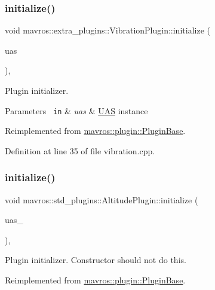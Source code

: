 \subsubsection{\texorpdfstring{initialize()}{initialize()}\hspace{0.1cm}{\footnotesize\ttfamily [8/41]}}
{\footnotesize\ttfamily void mavros\+::extra\+\_\+plugins\+::\+Vibration\+Plugin\+::initialize (\begin{DoxyParamCaption}\item[{\mbox{\hyperlink{classmavros_1_1UAS}{U\+AS}} \&}]{uas }\end{DoxyParamCaption})\hspace{0.3cm}{\ttfamily [inline]}, {\ttfamily [virtual]}}



Plugin initializer. 


\begin{DoxyParams}[1]{Parameters}
\mbox{\texttt{ in}}  & {\em uas} & {\ttfamily \mbox{\hyperlink{classmavros_1_1UAS}{U\+AS}}} instance \\
\hline
\end{DoxyParams}


Reimplemented from \mbox{\hyperlink{group__plugin_gad5313a41da4d26acbbabf008cdc21e82}{mavros\+::plugin\+::\+Plugin\+Base}}.



Definition at line 35 of file vibration.\+cpp.

\mbox{\label{group__plugin_ga5aeb9ab8ababf66ba15c0bf2705c6162}} 
\subsubsection{\texorpdfstring{initialize()}{initialize()}\hspace{0.1cm}{\footnotesize\ttfamily [9/41]}}
{\footnotesize\ttfamily void mavros\+::std\+\_\+plugins\+::\+Altitude\+Plugin\+::initialize (\begin{DoxyParamCaption}\item[{\mbox{\hyperlink{classmavros_1_1UAS}{U\+AS}} \&}]{uas\+\_\+ }\end{DoxyParamCaption})\hspace{0.3cm}{\ttfamily [inline]}, {\ttfamily [virtual]}}

Plugin initializer. Constructor should not do this. 

Reimplemented from \mbox{\hyperlink{group__plugin_gad5313a41da4d26acbbabf008cdc21e82}{mavros\+::plugin\+::\+Plugin\+Base}}.



